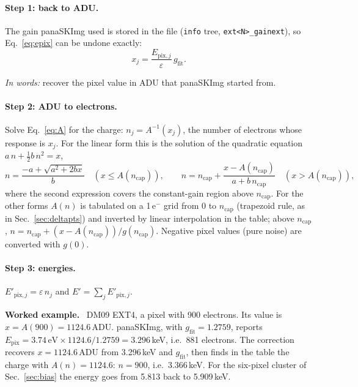 \documentclass[11pt,a4paper]{article}
\newcommand{\code}[1]{\texttt{#1}}
\newcommand{\eminus}{e$^-$}
\newcommand{\gfit}{g_{\mathrm{fit}}}
\newcommand{\ncap}{n_{\mathrm{cap}}}
\newenvironment{example}%
  {\par\smallskip\noindent\begin{lrbox}{\exbox}\begin{minipage}{0.96\linewidth}\small\textbf{Worked example.}\ }%
  {\end{minipage}\end{lrbox}\colorbox{black!6}{\usebox{\exbox}}\par\smallskip}
\newcommand{\inwords}[1]{\par\noindent\textit{In words:} #1\par}
\begin{document}
\paragraph{Step 1: back to ADU.} The gain panaSKImg used is stored in the file
(\code{info} tree, \code{ext<N>\_gainext}), so Eq.~\ref{eq:epix} can be undone exactly:
\begin{equation}
x_j = \frac{E_{\mathrm{pix},j}}{\varepsilon}\,\gfit .
\end{equation}
\inwords{recover the pixel value in ADU that panaSKImg started from.}

\paragraph{Step 2: ADU to electrons.} Solve Eq.~\ref{eq:A} for the charge: $n_j = A^{-1}(x_j)$, the
number of electrons whose response is $x_j$. For the linear form this is the solution of the quadratic
equation $a\,n + \frac12 b\,n^2 = x$,
\begin{equation}
n = \frac{-a + \sqrt{a^2 + 2 b x}}{b} \quad (x \le A(\ncap)), \qquad
n = \ncap + \frac{x - A(\ncap)}{a + b\,\ncap} \quad (x > A(\ncap)),
\end{equation}
where the second expression covers the constant-gain region above $\ncap$. For the other forms $A(n)$ is
tabulated on a 1\,\eminus{} grid from 0 to $\ncap$ (trapezoid rule, as in Sec.~\ref{sec:deltapts}) and
inverted by linear interpolation in the table; above $\ncap$, $n = \ncap + (x - A(\ncap))/g(\ncap)$.
Negative pixel values (pure noise) are converted with $g(0)$.

\paragraph{Step 3: energies.} $E'_{\mathrm{pix},j} = \varepsilon\, n_j$ and $E' = \sum_j E'_{\mathrm{pix},j}$.

\begin{example}
DM09 EXT4, a pixel with 900 electrons. Its value is $x = A(900) = 1124.6$\,ADU. panaSKImg, with
$\gfit = 1.2759$, reports $E_{\mathrm{pix}} = 3.74\,\mathrm{eV} \times 1124.6/1.2759 = 3.296$\,keV, i.e.\
881 electrons. The correction recovers $x = 1124.6$\,ADU from 3.296\,keV and $\gfit$, then finds in the
table the charge with $A(n) = 1124.6$: $n = 900$, i.e.\ 3.366\,keV. For the six-pixel cluster of
Sec.~\ref{sec:bias} the energy goes from 5.813 back to 5.909\,keV.
\end{example}
\end{document}
